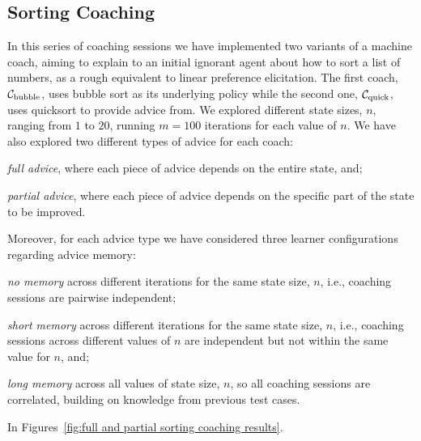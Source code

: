 \documentclass[a4paper, 10pt]{article}
\newcommand{\bubblecoach}{\ensuremath{\mathcal{C}_{\rm bubble}}}
\newcommand{\quickcoach}{\ensuremath{\mathcal{C}_{\rm quick}}}
\begin{document}
	\subsection{Sorting Coaching}\label{subsec:sorting-coaching}
	In this series of coaching sessions we have implemented two variants of a machine coach, aiming to explain to an initial ignorant agent about how to sort a list of numbers, as a rough equivalent to linear preference elicitation. The first coach, \bubblecoach, uses bubble sort as its underlying policy while the second one, \quickcoach, uses quicksort to provide advice from. We explored different state sizes, $n$, ranging from $1$ to $20$, running $m=100$ iterations for each value of $n$. We have also explored two different types of advice for each coach:
	\begin{enumerate*}[label=(A\arabic*)]
		\item \emph{full advice}, where each piece of advice depends on the entire state, and;
		\item \emph{partial advice}, where each piece of advice depends on the specific part of the state to be improved.
	\end{enumerate*}
	Moreover, for each advice type we have considered three learner configurations regarding advice memory:
	\begin{enumerate*}[label=(C\arabic*)]
		\item \emph{no memory} across different iterations for the same state size, $n$, i.e., coaching sessions are pairwise independent;
		\item \emph{short memory} across different iterations for the same state size, $n$, i.e., coaching sessions across different values of $n$ are independent but not within the same value for $n$, and;
		\item \emph{long memory} across all values of state size, $n$, so all coaching sessions are correlated, building on knowledge from previous test cases.
	\end{enumerate*}
	In Figures~\ref{fig:full and partial sorting coaching results}.
	
\end{document}
